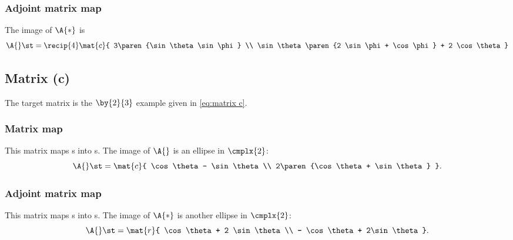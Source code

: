 \subsubsection{Adjoint matrix map} 
The image of $\A{*}$ is
\begin{equation}
  \A{} \st = \recip{4} \mat{c}{ 3\paren{\sin \theta \sin \phi} \\ \sin \theta \paren{2 \sin \phi + \cos \phi} + 2 \cos \theta }
\end{equation}


\subsection{Matrix (c)}
The target matrix is the $\by{2}{3}$ example given in \eqref{eq:matrix c}.

\subsubsection{Matrix map} 
This matrix maps \vv s into \vv s. The image of $\A{}$ is an ellipse in $\cmplx{2}$:
%
\begin{equation}
  \A{} \st = 
    \mat{c}{ \cos \theta - \sin \theta \\ 2\paren{\cos \theta + \sin \theta} } .
\end{equation}

\subsubsection{Adjoint matrix map} 
This matrix maps \vv s into \vv s. The image of $\A{*}$ is another ellipse in $\cmplx{2}$:
%
\begin{equation}
  \A{} \st = \mat{r}{ \cos \theta + 2 \sin \theta \\ - \cos \theta + 2\sin \theta} .
\end{equation}



\endinput
